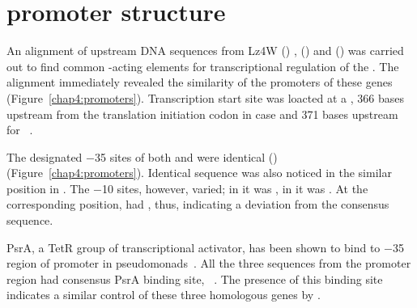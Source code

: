 \section{ promoter structure}

An alignment of upstream DNA sequences from Lz4W 
(\lzsig{}) ,   (\pasig{}) and   (\ppsig{}) was carried out to find common
-acting elements for transcriptional regulation of the
. The alignment immediately revealed the similarity of the
promoters of these genes (Figure~\ref{chap4:promoters}).
Transcription start site was loacted at a , 366 bases
upstream from the translation initiation codon in case \pasig{}
\citep{Tanaka1994} and 371 bases upstream for
\ppsig{}~\citep{Kojic2002}.

The designated $-$35 sites of both \pasig{} and \ppsig{} were
identical () (Figure~\ref{chap4:promoters}). Identical
sequence was also noticed in the similar position in \lzsig{}. The
$-$10 sites, however, varied; in \pasig{} it was , in
\ppsig{} it was \@. At the corresponding position,
\lzsig{} had , thus, indicating a deviation from the
consensus sequence.

PsrA, a TetR group of transcriptional activator, has been shown to
bind to $-$35 region of  promoter in
pseudomonads~\citep[][see also
Section~\ref{chap1:psra}]{Kojic2001,Kojic2002}. All the three
sequences from the promoter region had consensus PsrA binding
site, ~\citep[][see also
Section~\ref{chap1:psra}]{Kojic2001,Kojic2002}. The presence of
this binding site indicates a similar control of these three
homologous genes by .

